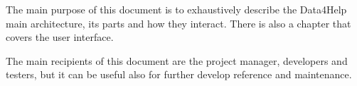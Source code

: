 The main purpose of this document is to exhaustively describe the Data4Help main architecture, its parts and how they interact. There is also a chapter that covers the user interface.

The main recipients of this document are the project manager, developers and testers, but it can be useful also for further develop reference and maintenance.